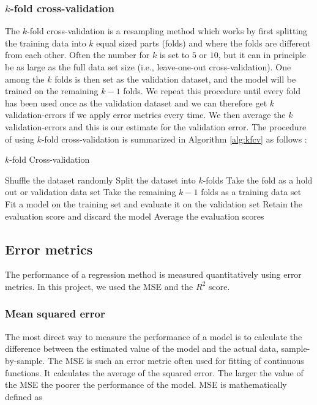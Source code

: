 \documentclass[a4paper]{article}
\begin{document}
\subsubsection*{$k$-fold cross-validation}
\label{kfold}
The $k$-fold cross-validation is a resampling method which works by first splitting the training data into $k$ equal sized parts (folds) and where the folds are different from each other. Often the number for $k$ is set to $5$ or $10$, but it can in principle be as large as the full data set size (i.e., leave-one-out cross-validation). One among the $k$ folds is then set as the validation dataset, and the model will be trained on the remaining $k-1$ folds. We repeat this procedure until every fold has been used once as the validation dataset and we can therefore get $k$ validation-errors if we apply error metrics every time. We then average the $k$ validation-errors and this is our estimate for the validation error. The procedure of using $k$-fold cross-validation is summarized in Algorithm \ref{alg:kfcv} as follows \cite{lec} \cite{hastie}:

\begin{algorithm}[H]
    \caption{$k$-fold Cross-validation}
    \label{alg:kfcv}
    \begin{algorithmic}[1]
        \State Shuffle the dataset randomly
        \State Split the dataset into $k$-folds
            \State Take the fold as a hold out or validation data set
            \State Take the remaining $k-1$ folds as a training data set
            \State Fit a model on the training set and evaluate it on the validation set
            \State Retain the evaluation score and discard the model
        \EndFor
        \State Average the evaluation scores
    \end{algorithmic}
\end{algorithm}

\subsection{Error metrics}
The performance of a regression method is measured quantitatively using error metrics. In this project, we used the MSE and the $R^2$ score.

\subsubsection*{Mean squared error}

The most direct way to measure the performance of a model is to calculate the difference between the estimated value of the model and the actual data, sample-by-sample. The MSE is such an error metric often used for fitting of continuous functions. It calculates the average of the squared error. The larger the value of the MSE the poorer the performance of the model. MSE is mathematically defined as
\end{document}
